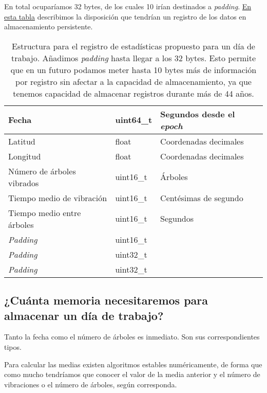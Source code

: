 En total ocuparíamos 32 bytes, de los cuales 10 irían destinados a \textit{padding}.
\hyperref[table:almacenamiento]{En esta tabla} describimos la disposición que tendrían un registro
de los datos en almacenamiento persistente.

\begin{table}[H]
    \centering
    \begin{tabular}{|l|l|l|}
        \hline
        Fecha                        & uint64\_t & Segundos desde el \textit{epoch} \\ \hline
        Latitud                      & float & Coordenadas decimales \\ \hline
        Longitud                     & float & Coordenadas decimales \\ \hline
        Número de árboles vibrados   & uint16\_t & Árboles \\ \hline
        Tiempo medio de vibración    & uint16\_t & Centésimas de segundo \\ \hline
        Tiempo medio entre árboles   & uint16\_t & Segundos \\ \hline
        \textit{Padding}             & uint16\_t &  \\ \hline
        \textit{Padding}             & uint32\_t &  \\ \hline
        \textit{Padding}             & uint32\_t &  \\ \hline
    \end{tabular}
    \caption{Estructura para el registro de estadísticas propuesto para un día de trabajo.
    Añadimos \textit{padding} hasta llegar a los 32 bytes. Esto permite que en un futuro
    podamos meter hasta 10 bytes más de información por registro sin afectar a la capacidad
    de almacenamiento, ya que tenemos capacidad de almacenar registros durante más de 44 años.}
    \label{table:almacenamiento}
\end{table}

\subsection{¿Cuánta memoria necesitaremos para almacenar un día de trabajo?}

Tanto la fecha como el número de árboles es inmediato. Son sus correspondientes tipos.

Para calcular las medias existen algoritmos estables numéricamente, de forma que como mucho
tendríamos que conocer el valor de la media anterior y el número de vibraciones o el número
de árboles, según corresponda.

